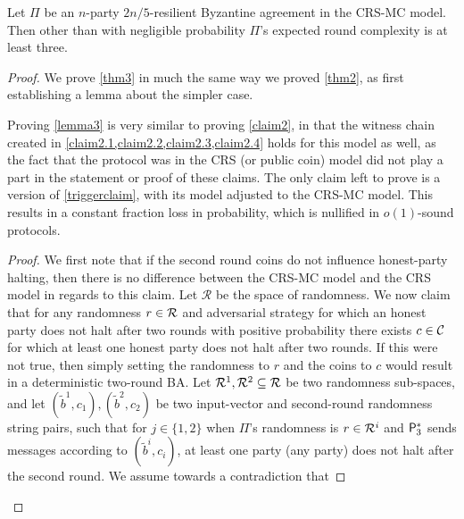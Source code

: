 \begin{theorem} \label{thm3}
	Let $\Pi$ be an $n$-party $2n/5$-resilient Byzantine agreement in the CRS-MC model. Then other than with negligible probability $\Pi$'s expected round complexity is at least three.
\end{theorem}

\begin{proof}
We prove \cref{thm3} in much the same way we proved \cref{thm2}, as first establishing a lemma about the simpler  case.



Proving \cref{lemma3} is very similar to proving \cref{claim2}, in that the witness chain created in \cref{claim2.1,claim2.2,claim2.3,claim2.4} holds for this model as well, as the fact that the protocol was in the CRS (or public coin) model did not play a part in the statement or proof of these claims. The only claim left to prove is a version of \cref{triggerclaim}, with its model adjusted to the CRS-MC model. This results in a constant fraction loss in probability, which is nullified in $o(1)$-sound protocols.



	\begin{proof}
		We first note that if the second round coins do not influence honest-party halting, then there is no difference between the CRS-MC model and the CRS model in regards to this claim. Let $\mathcal{R}$ be the space of randomness. We now claim that for any randomness $r \in \mathcal{R}$ and adversarial strategy for which an honest party does not halt after two rounds with positive probability there exists $c \in \mathcal{C}$ for which at least one honest party does not halt after two rounds. If this were not true, then simply setting the randomness to $r$ and the coins to $c$ would result in a deterministic two-round BA. Let $\mathcal{R}^1,\mathcal{R}^2 \subseteq \mathcal{R}$ be two randomness sub-spaces, and let $(\tilde{b}^1,c_1), (\tilde{b}^2,c_2)$ be two input-vector and second-round randomness string pairs, such that for $j \in \{1,2\}$ when $\Pi$'s randomness is $r \in \mathcal{R}^i$ and $\mathsf{P}_3^\ast$ sends messages according to $(\tilde{b}^i,c_i)$, at least one party (any party) does not halt after the second round. We assume towards a contradiction that
		

\end{proof}
\end{proof}
